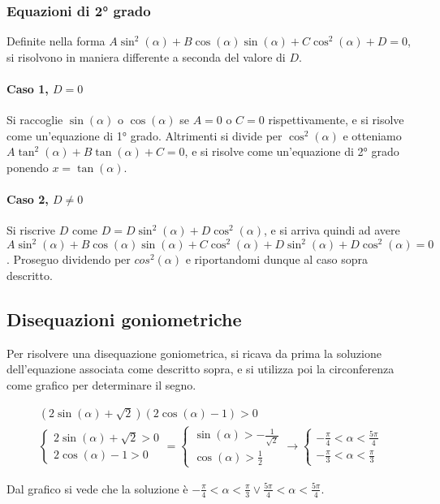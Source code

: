\subsubsection{Equazioni di 2° grado}

Definite nella forma $A\sin^2(\alpha) + B\cos(\alpha)\sin(\alpha) + C\cos^2(\alpha) + D = 0$, si risolvono in maniera differente a seconda del valore di $D$.

\paragraph{Caso 1, $D = 0$}

Si raccoglie $\sin(\alpha)$ o $\cos(\alpha)$ se $A = 0$ o $C = 0$ rispettivamente, e si risolve come un'equazione di 1° grado.
Altrimenti si divide per $\cos^2(\alpha)$ e otteniamo $A\tan^2(\alpha) + B\tan(\alpha) + C = 0$, e si risolve come un'equazione di 2° grado ponendo $x = \tan(\alpha)$.

\paragraph{Caso 2, $D \neq 0$}

Si riscrive $D$ come $D = D\sin^2(\alpha) + D\cos^2(\alpha)$, e si arriva quindi ad avere $A\sin^2(\alpha) + B\cos(\alpha)\sin(\alpha) + C\cos^2(\alpha) + D\sin^2(\alpha) + D\cos^2(\alpha) = 0$.
Proseguo dividendo per $cos^2(\alpha)$ e riportandomi dunque al caso sopra descritto.


\subsection{Disequazioni goniometriche}

Per risolvere una disequazione goniometrica, si ricava da prima la soluzione dell'equazione associata come descritto sopra, e si utilizza poi la circonferenza come grafico per determinare il segno.

\begin{gather}
    (2\sin(\alpha) + \sqrt{2})(2\cos(\alpha) - 1) > 0 \\
    \begin{cases}
        2\sin(\alpha) + \sqrt{2} > 0 \\
        2\cos(\alpha) - 1 > 0
    \end{cases}
    =
    \begin{cases}
        \sin(\alpha) > -\frac{1}{\sqrt{2}} \\
        \cos(\alpha) > \frac{1}{2}
    \end{cases}
    \rightarrow
    \begin{cases}
        -\frac{\pi}{4} < \alpha < \frac{5\pi}{4} \\
        -\frac{\pi}{3} < \alpha < \frac{\pi}{3}
    \end{cases}
\end{gather}


Dal grafico si vede che la soluzione è $-\frac{\pi}{4} < \alpha < \frac{\pi}{3} \vee \frac{5\pi}{4} < \alpha < \frac{5\pi}{4}$.

